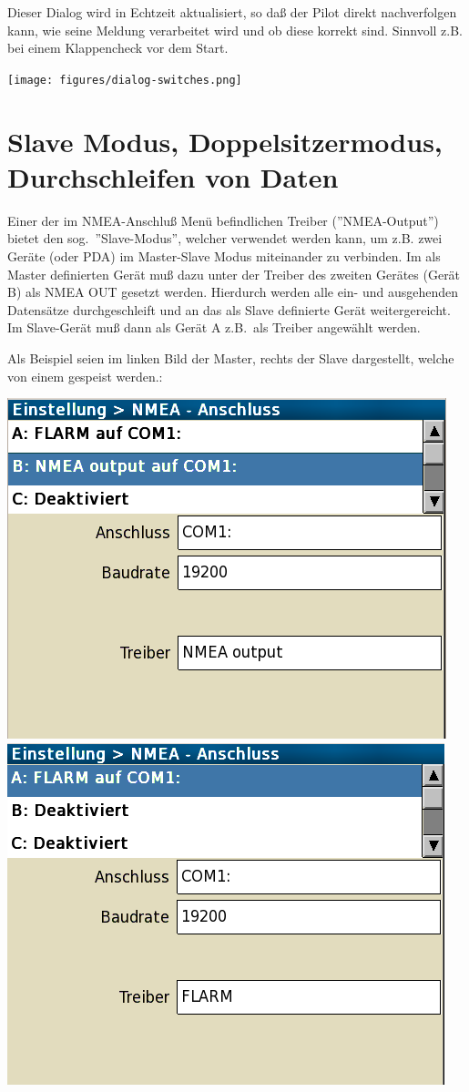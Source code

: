 Dieser Dialog wird in Echtzeit aktualisiert, so daß der Pilot  direkt 
nachverfolgen kann, wie seine Meldung verarbeitet wird und ob diese korrekt sind. 
Sinnvoll z.B. bei einem Klappencheck vor dem Start.


\begin{center}
\texttt{[image: figures/dialog-switches.png]}
\end{center}
\section{Slave Modus, Doppelsitzermodus, Durchschleifen von Daten}

Einer der im NMEA-Anschluß Menü befindlichen Treiber (''NMEA-Output'')
bietet den 
sog.\  ''Slave-Modus'', welcher verwendet werden kann,  um z.B. zwei Geräte  (\al oder \textsf{PDA})  im Master-Slave Modus miteinander zu verbinden. 
Im als Master definierten Gerät muß dazu unter der Treiber des zweiten  Gerätes (Gerät B) als NMEA OUT gesetzt werden.
Hierdurch werden alle ein- und ausgehenden Datensätze  durchgeschleift und an das als Slave definierte Gerät weitergereicht.
Im Slave-Gerät muß dann als Gerät A z.B.\ \fl als Treiber angewählt werden.

Als Beispiel seien im linken Bild der Master, rechts der Slave dargestellt, welche von einem \fl gespeist werden.:


\begin{center}%
\includegraphics[angle=0,width=0.45\linewidth,keepaspectratio='true']{figures/config-nmea-ms-master.png}\quad
\includegraphics[angle=0,width=0.45\linewidth,keepaspectratio='true']{figures/config-nmea-ms-slave.png}
\end{center}

